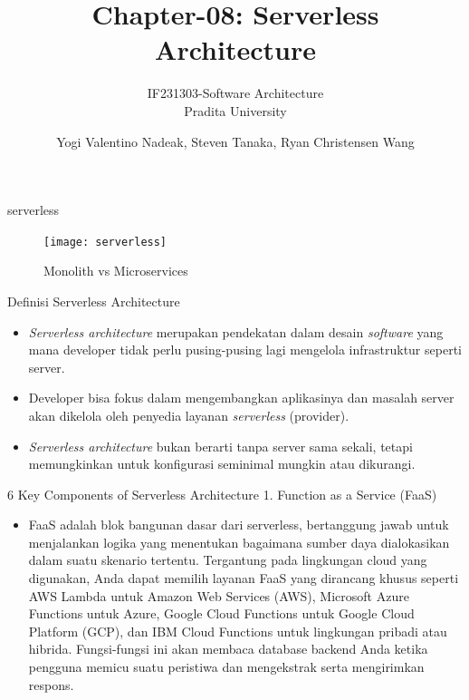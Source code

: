 \documentclass{beamer}
\title{Chapter-08: Serverless Architecture}
\subtitle{IF231303-Software Architecture\\Pradita University}
\author{Yogi Valentino Nadeak, Steven Tanaka, Ryan Christensen Wang}
\begin{document}
	\begin{frame}{serverless}
		\begin{figure}[h]
			\centering
			\texttt{[image: serverless]}
			\caption{Monolith vs Microservices}
			\label{fig:serverless}
		\end{figure}
	\end{frame}

    \begin{frame}[plain]
		\maketitle
	\end{frame}
	

    \begin{frame}{Definisi Serverless Architecture}
        \begin{itemize}
            \item \emph{Serverless architecture} merupakan pendekatan dalam desain \emph{software} yang mana developer tidak perlu pusing-pusing lagi mengelola infrastruktur seperti server.
            \item Developer bisa fokus dalam mengembangkan aplikasinya dan masalah server akan dikelola oleh penyedia layanan \emph{serverless} (provider).
            \item \emph{Serverless architecture} bukan berarti tanpa server sama sekali, tetapi memungkinkan untuk konfigurasi seminimal mungkin atau dikurangi.
        \end{itemize}
    \end{frame}

    \begin{frame}{6 Key Components of Serverless Architecture}
    	1. Function as a Service (FaaS)
        \begin{itemize}
            \item 
            FaaS adalah blok bangunan dasar dari serverless, bertanggung jawab untuk menjalankan logika yang menentukan bagaimana sumber daya dialokasikan dalam suatu skenario tertentu. 
            Tergantung pada lingkungan cloud yang digunakan, Anda dapat memilih layanan FaaS yang dirancang khusus seperti AWS Lambda untuk Amazon Web Services (AWS), Microsoft Azure Functions untuk Azure, Google Cloud Functions untuk Google Cloud Platform (GCP), dan IBM Cloud Functions untuk lingkungan pribadi atau hibrida. 
            Fungsi-fungsi ini akan membaca database backend Anda ketika pengguna memicu suatu peristiwa dan mengekstrak serta mengirimkan respons.
        \end{itemize}
    \end{frame}
\end{document}
